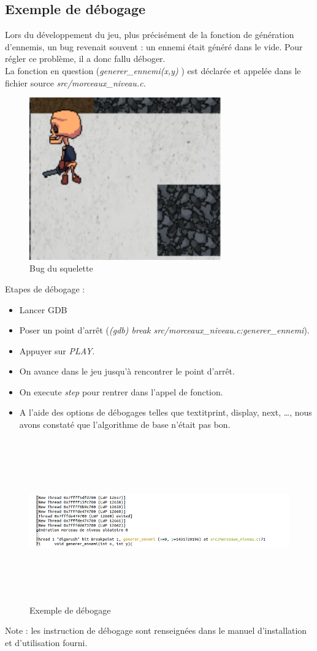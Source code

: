 \documentclass[a4paper,12pt]{article}
\begin{document}
\begin{appendices}
\section{Exemple de débogage}
Lors du développement du jeu, plus précisément de la fonction de génération d'ennemis, un bug revenait souvent : un ennemi était généré dans le vide. Pour régler ce problème, il a donc fallu déboger.\\
La fonction en question (\textit{generer\_ennemi(x,y)} ) est déclarée et appelée dans le fichier source \textit{src/morceaux\_niveau.c.}\\
\begin{figure}[h]
	\centering
	\includegraphics[height=7cm]{img/bug.png}
	\caption{Bug du squelette}
	\label{Bug}
\end{figure}
Etapes de débogage : 
\begin{itemize}
	\item Lancer GDB
	\item Poser un point d'arrêt (\textit{(gdb) break src/morceaux\_niveau.c:generer\_ennemi}).
	\item Appuyer sur \textit{PLAY}.
	\item On avance dans le jeu jusqu'à rencontrer le point d'arrêt.
	\item On execute \textit{step} pour rentrer dans l'appel de fonction.
	\item A l'aide des options de débogages telles que textit{print, display, next, \dots}, nous avons constaté que l'algorithme de base n'était pas bon.
\end{itemize}
\begin{figure}[h]
	\centering
	\includegraphics[height=7cm]{img/debug.png}
	\caption{Exemple de débogage}
	\label{débogage}
\end{figure}
Note : les instruction de débogage sont renseignées dans le manuel d'installation et d'utilisation fourni.


\end{appendices}
\end{document}
